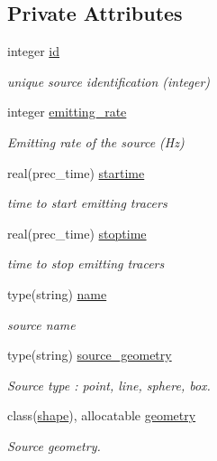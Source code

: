 \subsection*{Private Attributes}
\begin{DoxyCompactItemize}
\item 
integer \mbox{\hyperlink{structsources__mod_1_1source__par_a88d333946d18fee527b7b207f44dd3ff}{id}}
\begin{DoxyCompactList}\small\item\em unique source identification (integer) \end{DoxyCompactList}\item 
integer \mbox{\hyperlink{structsources__mod_1_1source__par_a4edfa7359d6e8ee0e066dbdd1f5b25a4}{emitting\+\_\+rate}}
\begin{DoxyCompactList}\small\item\em Emitting rate of the source (Hz) \end{DoxyCompactList}\item 
real(prec\+\_\+time) \mbox{\hyperlink{structsources__mod_1_1source__par_afcde2655b2a557f3a3e2c952dc8a51b0}{startime}}
\begin{DoxyCompactList}\small\item\em time to start emitting tracers \end{DoxyCompactList}\item 
real(prec\+\_\+time) \mbox{\hyperlink{structsources__mod_1_1source__par_ac2c04f0d36ad034e160e3de15fe0c283}{stoptime}}
\begin{DoxyCompactList}\small\item\em time to stop emitting tracers \end{DoxyCompactList}\item 
type(string) \mbox{\hyperlink{structsources__mod_1_1source__par_ac56d7761e7da3a906a3f0fbf4c7f49f8}{name}}
\begin{DoxyCompactList}\small\item\em source name \end{DoxyCompactList}\item 
type(string) \mbox{\hyperlink{structsources__mod_1_1source__par_a66e7627f128290f25c2c9eb36808eb5b}{source\+\_\+geometry}}
\begin{DoxyCompactList}\small\item\em Source type \+: \textquotesingle{}point\textquotesingle{}, \textquotesingle{}line\textquotesingle{}, \textquotesingle{}sphere\textquotesingle{}, \textquotesingle{}box\textquotesingle{}. \end{DoxyCompactList}\item 
class(\mbox{\hyperlink{structgeometry__mod_1_1shape}{shape}}), allocatable \mbox{\hyperlink{structsources__mod_1_1source__par_abf09d59fd65f02d1a8139e2f9f477207}{geometry}}
\begin{DoxyCompactList}\small\item\em Source geometry. \end{DoxyCompactList}\end{DoxyCompactItemize}


